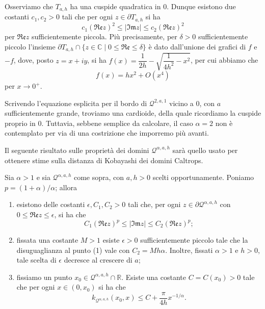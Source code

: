 Osserviamo che $T_{a,h}$ ha una cuspide quadratica in $0$. Dunque esistono due costanti $c_1,c_2>0$ tali che per ogni $z\in\partial T_{a,h}$ si ha
\begin{equation} \label{cusp_estimate}
    c_1(\mathfrak{Re}z)^2 \le |\mathfrak{Im}z| \le c_2(\mathfrak{Re}z)^2
\end{equation}
per $\mathfrak{Re}z$ sufficientemente piccola. Più precisamente, per $\delta>0$ sufficientemente piccolo l'insieme $\partial T_{a,h}\cap\{z\in\mathbb{C}\mid 0 \le \mathfrak{Re}\le\delta\}$ è dato dall'unione dei grafici di $f$ e $-f$, dove, posto $z=x+iy$, si ha $f(x)=\dfrac{1}{2h}-\sqrt{\dfrac{1}{4h^2}-x^2}$, per cui abbiamo che
\begin{equation} \label{cerchio}
    f(x)=hx^2+O(x^4)
\end{equation}
per $x\longrightarrow0^+$.

\begin{oss}
    Scrivendo l'equazione esplicita per il bordo di $\mathcal{Q}^{2,a,1}$ vicino a $0$, con $a$ sufficientemente grande, troviamo una cardioide, della quale ricordiamo la cuspide proprio in $0$. Tuttavia, sebbene semplice da calcolare, il caso $\alpha=2$ non è contemplato per via di una costrizione che imporremo più avanti.
\end{oss}

Il seguente risultato sulle proprietà dei domini $\mathcal{Q}^{\alpha,a,h}$ sarà quello usato per ottenere stime sulla distanza di Kobayashi dei domini Caltrops.

\begin{prop} \label{qaah_biolo}
    Sia $\alpha>1$ e sia $\mathcal{Q}^{\alpha,a,h}$ come sopra, con $a,h>0$ scelti opportunamente. Poniamo $p=(1+\alpha)/\alpha$; allora
    \begin{enumerate}[label={(\arabic*)}]
        \item esistono delle costanti $\epsilon,C_1,C_2>0$ tali che, per ogni $z\in\partial\mathcal{Q}^{\alpha,a,h}$ con $0\le\mathfrak{Re}z\le\epsilon$, si ha che
        $$C_1(\mathfrak{Re}z)^p \le |\mathfrak{Im}z| \le C_2(\mathfrak{Re}z)^p;$$
        \item fissata una costante $M>1$ esiste $\epsilon>0$ sufficientemente piccolo tale che la disuguaglianza al punto (1) vale con $C_2=Mh\alpha$. Inoltre, fissati $\alpha>1$ e $h>0$, tale scelta di $\epsilon$ decresce al crescere di $a$;
        \item fissiamo un punto $x_0\in\mathcal{Q}^{\alpha,a,h}\cap\mathbb{R}$. Esiste una costante $C=C(x_0)>0$ tale che per ogni $x\in(0,x_0)$ si ha che
        $$k_{\mathcal{Q}^{\alpha,a,h}}(x_0,x) \le C+\frac{\pi}{4h}x^{-1/\alpha}.$$
    \end{enumerate}
\end{prop}

